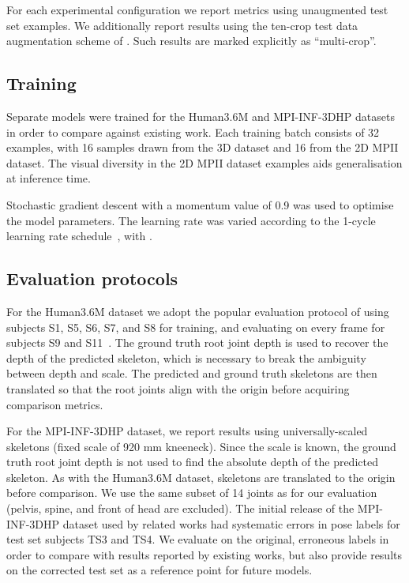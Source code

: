 \documentclass[australian,10pt,twocolumn,letterpaper,twocolumn]{article}
\begin{document}
For each experimental configuration we report metrics using unaugmented
test set examples. We additionally report results using the ten-crop
test data augmentation scheme of \citet{luvizon20182d}. Such results
are marked explicitly as ``multi-crop''.

\subsection{Training}

Separate models were trained for the Human3.6M and MPI-INF-3DHP datasets
in order to compare against existing work. Each training batch consists
of 32 examples, with 16 samples drawn from the 3D dataset and 16 from
the 2D MPII dataset. The visual diversity in the 2D MPII dataset examples
aids generalisation at inference time.

Stochastic gradient descent with a momentum value of 0.9 was used
to optimise the model parameters. The learning rate was varied according
to the 1-cycle learning rate schedule~\citep{smith2018disciplined},
with .

\subsection{Evaluation protocols}

For the Human3.6M dataset we adopt the popular evaluation protocol
of using subjects S1, S5, S6, S7, and S8 for training, and evaluating
on every  frame for subjects S9 and S11~\citep{sun2017compositional,luvizon20182d}.
The ground truth root joint depth is used to recover the depth of
the predicted skeleton, which is necessary to break the ambiguity
between depth and scale. The predicted and ground truth skeletons
are then translated so that the root joints align with the origin
before acquiring comparison metrics.

For the MPI-INF-3DHP dataset, we report results using universally-scaled
skeletons (fixed scale of 920 mm knee\textendash neck). Since the
scale is known, the ground truth root joint depth is not used to find
the absolute depth of the predicted skeleton. As with the Human3.6M
dataset, skeletons are translated to the origin before comparison.
We use the same subset of 14 joints as \citet{mehta2017vnect} for
our evaluation (\ie pelvis, spine, and front of head are excluded).
The initial release of the MPI-INF-3DHP dataset used by related works
\citep{mehta2017vnect,dabral2017structure,kanazawa2017end} had systematic
errors in pose labels for test set subjects TS3 and TS4. We evaluate
on the original, erroneous labels in order to compare with results
reported by existing works, but also provide results on the corrected
test set as a reference point for future models.
\end{document}
